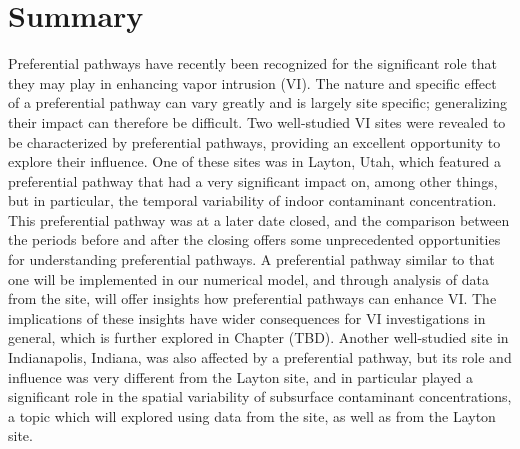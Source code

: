 \section{Summary}

Preferential pathways have recently been recognized for the significant role that they may play in enhancing vapor intrusion (VI).
The nature and specific effect of a preferential pathway can vary greatly and is largely site specific; generalizing their impact can therefore be difficult.
Two well-studied VI sites were revealed to be characterized by preferential pathways, providing an excellent opportunity to explore their influence.
One of these sites was in Layton, Utah, which featured a preferential pathway that had a very significant impact on, among other things, but in particular, the temporal variability of indoor contaminant concentration.
This preferential pathway was at a later date closed, and the comparison between the periods before and after the closing offers some unprecedented opportunities for understanding preferential pathways.
A preferential pathway similar to that one will be implemented in our numerical model, and through analysis of data from the site, will offer insights how preferential pathways can enhance VI.
The implications of these insights have wider consequences for VI investigations in general, which is further explored in Chapter (TBD). %
Another well-studied site in Indianapolis, Indiana, was also affected by a preferential pathway, but its role and influence was very different from the Layton site, and in particular played a significant role in the spatial variability of subsurface contaminant concentrations, a topic which will explored using data from the site, as well as from the Layton site.
